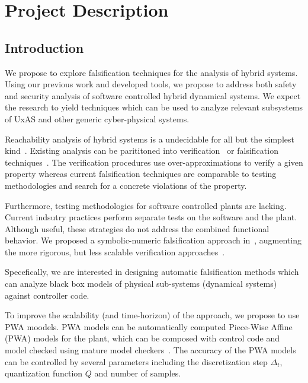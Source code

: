 \section{Project Description}

%
%
%

\subsection{Introduction}

We propose to explore falsification techniques for the analysis of
hybrid systems. Using our previous work and developed tools, we
propose to address both safety and security analysis of software
controlled hybrid dynamical systems. We expect the research to yield
techniques which can be used to analyze relevant subsystems of UxAS
and other generic cyber-physical systems.

Reachability analysis of hybrid systems is a undecidable for all but
the simplest kind~\cite{henzinger1995s}. Existing analysis can be
parititoned into verification~\cite{tiwari2012hybridsal,
Chen2012taylor, Frehse+Others/2011/SpaceEx, althoff2016combining,
duggirala2015c2e2} or falsification techniques~\cite{annpureddy2011s,
donze2010breach, dreossi2015efficient}.
The verification procedures use
over-approximations to verify a given property whereas current
falsification techniques are comparable to testing methodologies and
search for a concrete violations of the property.

Furthermore, testing methodologies for software controlled plants are
lacking. Current indsutry practices perform separate tests on the
software and the plant. Although useful, these strategies do not
address the combined functional behavior.  We proposed a
symbolic-numeric falsification approach in~\cite{zutshi2016symbolic},
augmenting the more rigorous, but less scalable verification
approaches~\cite{majumdar2012clse}.

Specefically, we are interested in designing automatic falsification
methods which can analyze black box models of physical sub-systems
(dynamical systems) against controller code.

To improve the scalability (and time-horizon) of the approach, we
propose to use PWA moodels. PWA models can be automatically computed
Piece-Wise Affine (PWA) models for the plant, which can be composed
with control code and model checked using mature model
checkers~\cite{kroening2014cbmc}.  The accuracy of the PWA models can
be controlled by several parameters including the discretization step
$\Delta_t$, quantization function $Q$ and number of samples.

